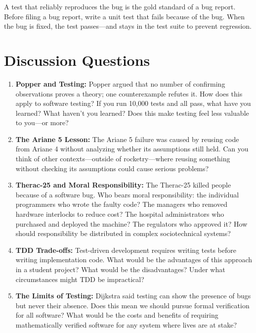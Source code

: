 \documentclass[11pt,letterpaper]{article}
\begin{document}
A test that reliably reproduces the bug is the gold standard of a bug report. Before filing a bug report, write a unit test that fails because of the bug. When the bug is fixed, the test passes---and stays in the test suite to prevent regression.

\section*{Discussion Questions}

\begin{questionbox}
\begin{enumerate}[leftmargin=*, label=\textcolor{cswarm}{\textbf{\arabic*.}}]
    \item \textbf{Popper and Testing:} Popper argued that no number of confirming observations proves a theory; one counterexample refutes it. How does this apply to software testing? If you run 10{,}000 tests and all pass, what have you learned? What haven't you learned? Does this make testing feel less valuable to you---or more?

    \item \textbf{The Ariane 5 Lesson:} The Ariane 5 failure was caused by reusing code from Ariane 4 without analyzing whether its assumptions still held. Can you think of other contexts---outside of rocketry---where reusing something without checking its assumptions could cause serious problems?

    \item \textbf{Therac-25 and Moral Responsibility:} The Therac-25 killed people because of a software bug. Who bears moral responsibility: the individual programmers who wrote the faulty code? The managers who removed hardware interlocks to reduce cost? The hospital administrators who purchased and deployed the machine? The regulators who approved it? How should responsibility be distributed in complex sociotechnical systems?

    \item \textbf{TDD Trade-offs:} Test-driven development requires writing tests before writing implementation code. What would be the advantages of this approach in a student project? What would be the disadvantages? Under what circumstances might TDD be impractical?

    \item \textbf{The Limits of Testing:} Dijkstra said testing can show the presence of bugs but never their absence. Does this mean we should pursue formal verification for all software? What would be the costs and benefits of requiring mathematically verified software for any system where lives are at stake?
\end{enumerate}
\end{questionbox}
\end{document}
